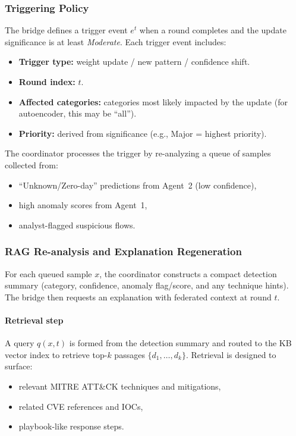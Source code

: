 \documentclass[conference]{IEEEtran}
\begin{document}
\subsubsection{Triggering Policy}
\label{sec:trigger-policy}

The bridge defines a trigger event $e^{t}$ when a round completes and the update significance is at least \emph{Moderate}. Each trigger event includes:
\begin{itemize}
  \item \textbf{Trigger type:} weight update / new pattern / confidence shift.
  \item \textbf{Round index:} $t$.
  \item \textbf{Affected categories:} categories most likely impacted by the update (for autoencoder, this may be ``all'').
  \item \textbf{Priority:} derived from significance (e.g., Major = highest priority).
\end{itemize}

The coordinator processes the trigger by re-analyzing a queue of samples collected from:
\begin{itemize}
  \item ``Unknown/Zero-day'' predictions from Agent~2 (low confidence),
  \item high anomaly scores from Agent~1,
  \item analyst-flagged suspicious flows.
\end{itemize}

\subsubsection{RAG Re-analysis and Explanation Regeneration}
\label{sec:rag-reanalysis}

For each queued sample $x$, the coordinator constructs a compact detection summary (category, confidence, anomaly flag/score, and any technique hints). The bridge then requests an explanation with federated context at round $t$.

\paragraph{Retrieval step}
A query $q(x,t)$ is formed from the detection summary and routed to the KB vector index to retrieve top-$k$ passages $\{d_1,\dots,d_k\}$. Retrieval is designed to surface:
\begin{itemize}
  \item relevant MITRE ATT\&CK techniques and mitigations,
  \item related CVE references and IOCs,
  \item playbook-like response steps.
\end{itemize}
\end{document}
